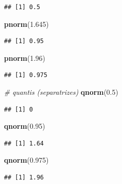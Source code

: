 \documentclass[
]{book}
\newenvironment{Shaded}{\begin{snugshade}}{\end{snugshade}}
\newcommand{\CommentTok}[1]{\textcolor[rgb]{0.56,0.35,0.01}{\textit{#1}}}
\newcommand{\FloatTok}[1]{\textcolor[rgb]{0.00,0.00,0.81}{#1}}
\newcommand{\KeywordTok}[1]{\textcolor[rgb]{0.13,0.29,0.53}{\textbf{#1}}}
\newcommand{\NormalTok}[1]{#1}
\theoremstyle{definition}
\theoremstyle{definition}
\theoremstyle{definition}
\theoremstyle{remark}
\begin{document}
\begin{verbatim}
## [1] 0.5
\end{verbatim}

\begin{Shaded}
\begin{Highlighting}[]
\KeywordTok{pnorm}\NormalTok{(}\FloatTok{1.645}\NormalTok{)}
\end{Highlighting}
\end{Shaded}

\begin{verbatim}
## [1] 0.95
\end{verbatim}

\begin{Shaded}
\begin{Highlighting}[]
\KeywordTok{pnorm}\NormalTok{(}\FloatTok{1.96}\NormalTok{)}
\end{Highlighting}
\end{Shaded}

\begin{verbatim}
## [1] 0.975
\end{verbatim}

\begin{Shaded}
\begin{Highlighting}[]
\CommentTok{\# quantis (separatrizes)}
\KeywordTok{qnorm}\NormalTok{(}\FloatTok{0.5}\NormalTok{)}
\end{Highlighting}
\end{Shaded}

\begin{verbatim}
## [1] 0
\end{verbatim}

\begin{Shaded}
\begin{Highlighting}[]
\KeywordTok{qnorm}\NormalTok{(}\FloatTok{0.95}\NormalTok{)}
\end{Highlighting}
\end{Shaded}

\begin{verbatim}
## [1] 1.64
\end{verbatim}

\begin{Shaded}
\begin{Highlighting}[]
\KeywordTok{qnorm}\NormalTok{(}\FloatTok{0.975}\NormalTok{)}
\end{Highlighting}
\end{Shaded}

\begin{verbatim}
## [1] 1.96
\end{verbatim}
\end{document}
